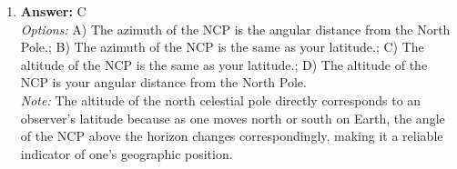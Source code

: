 \documentclass[12pt]{article}
\begin{document}
\begin{enumerate}[label=\arabic*.]
\\ \textit{Note:} The U.S.S.R. successfully deployed several landers to Venus, including the Venera series, which provided invaluable data about the planet's atmosphere and surface conditions, making it the only country to have achieved this feat.
\item \textbf{Answer:} C
\\ \textit{Options:} A) The azimuth of the NCP is the angular distance from the North Pole.; B) The azimuth of the NCP is the same as your latitude.; C) The altitude of the NCP is the same as your latitude.; D) The altitude of the NCP is your angular distance from the North Pole.
\\ \textit{Note:} The altitude of the north celestial pole directly corresponds to an observer's latitude because as one moves north or south on Earth, the angle of the NCP above the horizon changes correspondingly, making it a reliable indicator of one's geographic position.
\end{enumerate}
\end{document}
